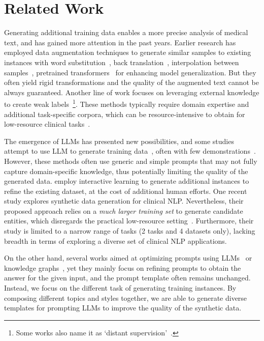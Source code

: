 \section{Related Work}
Generating additional training data enables a more precise analysis of medical text, and has gained more attention in the past years. 
Earlier research has employed data augmentation techniques to generate similar samples to existing instances with word substitution~\citep{kang2021umls,checklist}, back translation~\citep{uda}, interpolation between samples~\citep{chen2020mixtext,kan2023r}, pretrained transformers~\citep{kumar2020data,zhou2021flipda,melm} for enhancing model generalization. But they often yield rigid transformations and the quality of the augmented text cannot be always guaranteed. 
Another line of work focuses on leveraging external knowledge to create weak labels~\citep{ratner2017snorkel,fries2017swellshark,wang2019clinical,yu-etal-2021-fine,dunnmon2020cross,gao2022classifying,wander}\footnote{Some works also name it as `distant supervision'~\citep{mintz2009distant,min2013distant,liang2020bond}.}. 
These methods typically require domain expertise and additional task-specific corpora, which can be resource-intensive to obtain for low-resource clinical tasks~\citep{zhang2021wrench}. 

The emergence of LLMs has presented new possibilities, and some studies attempt to use LLM to generate training data~\citep{meng2022generating,meng2023tuning,ye2022zerogen,yu2023large,chung2023increasing}, often with few demonstrations~\citep{gpt3mix}. However, these methods often use generic and simple prompts that may not fully capture domain-specific knowledge, thus potentially limiting the quality of the generated data. 
\citet{liu2022wanli,chung2023increasing} employ interactive learning to generate additional instances to refine the existing dataset, at the cost of additional human efforts.
One recent study \citep{tang2023does} explores synthetic data generation for clinical NLP. Nevertheless, their proposed approach relies on a \emph{much larger training set} to generate candidate entities, which {disregards the practical low-resource setting}~\citep{perez2021true}. Furthermore, their study is limited to {a narrow range of tasks (2 tasks and 4 datasets only)}, lacking breadth in terms of exploring a diverse set of clinical NLP applications.

On the other hand, several works aimed at optimizing prompts using LLMs~\citep{mishra-etal-2022-reframing,zhou2023large,yang2023large} or knowledge graphs~\citep{chen2022knowprompt,hu-etal-2022-knowledgeable,liu-etal-2022-generated,kan2021zero}, yet they mainly focus on refining prompts to obtain the answer for the given input, and the prompt template often remains unchanged. 
Instead, we focus on the different task of generating training instances. By composing different topics and styles together, we are able to generate diverse templates for prompting LLMs to improve the quality of the synthetic data.